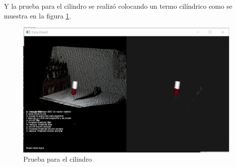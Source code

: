 Y la prueba para el \gls{cilindro} se realizó colocando un termo cilíndrico como se muestra en la figura \ref{fig:pruebaCyl}.


\begin{figure}[!htb] 
	\centering
	\includegraphics[width=1\textwidth]{03Resultados/imagenes/cilindro.JPG}
	\caption{Prueba para el cilindro} 
	\label{fig:pruebaCyl}
\end{figure}















	 
	 
	 
	 
	 
	 
